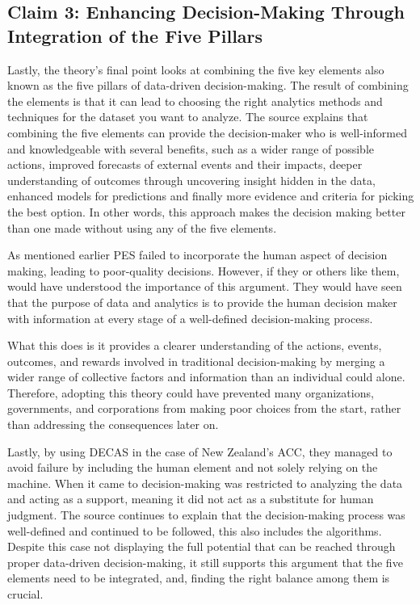 \subsection{Claim 3: Enhancing Decision-Making Through Integration of the Five Pillars}

Lastly, the theory’s final point looks at combining the five key elements also known as the five pillars of data-driven decision-making. The result of combining the elements is that it can lead to choosing the right analytics methods and techniques for the dataset you want to analyze. The source explains that combining the five elements can provide the decision-maker who is well-informed and knowledgeable with several benefits, such as a wider range of possible actions, improved forecasts of external events and their impacts, deeper understanding of outcomes through uncovering insight hidden in the data, enhanced models for predictions and finally more evidence and criteria for picking the best option. In other words, this approach makes the decision making better than one made without using any of the five elements.

As mentioned earlier PES failed to incorporate the human aspect of decision making, leading to poor-quality decisions. However, if they or others like them, would have understood the importance of this argument. They would have seen that the purpose of data and analytics is to provide the human decision maker with information at every stage of a well-defined decision-making process.

What this does is it provides a clearer understanding of the actions, events, outcomes, and rewards involved in traditional decision-making by merging a wider range of collective factors and information than an individual could alone. Therefore, adopting this theory could have prevented many organizations, governments, and corporations from making poor choices from the start, rather than addressing the consequences later on.


Lastly, by using DECAS in the case of New Zealand’s ACC, they managed to avoid failure by including the human element and not solely relying on the machine. When it came to decision-making was restricted to analyzing the data and acting as a support, meaning it did not act as a substitute for human judgment. The source continues to explain that the decision-making process was well-defined and continued to be followed, this also includes the algorithms. Despite this case not displaying the full potential that can be reached through proper data-driven decision-making, it still supports this argument that the five elements need to be integrated, and, finding the right balance among them is crucial.